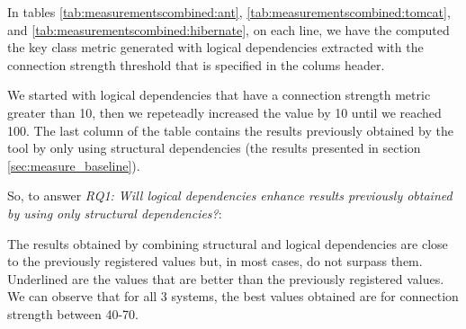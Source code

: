 \documentclass[runningheads]{comsis2}
\begin{document}
In tables \ref{tab:measurementscombined:ant}, \ref{tab:measurementscombined:tomcat}, and \ref{tab:measurementscombined:hibernate}, on each line, we have the computed the key class metric generated with logical dependencies extracted with the connection strength threshold that is specified in the colums header.

We started with logical dependencies that have a connection strength metric greater than 10, then we repeteadly increased the value by 10 until we reached 100. The last column of the table contains the results previously obtained by the tool by only using structural dependencies (the results presented in section \ref{sec:measure_baseline}).

So, to answer \textit{RQ1: Will logical dependencies enhance results previously obtained by using only structural dependencies?}:

The results obtained by combining structural and logical dependencies are close to the previously registered values but, in most cases, do not surpass them. Underlined are the values that are better than the previously registered values. We can observe that for all 3 systems, the best values obtained are for connection strength between 40-70.

\begin{table}[!h]
\setlength\tabcolsep{3.5pt}
\caption{Measurements for Ant using structural and logical dependencies combined}
\label{tab:measurementscombined:ant}
\centering
{}
\end{table}
\end{document}
